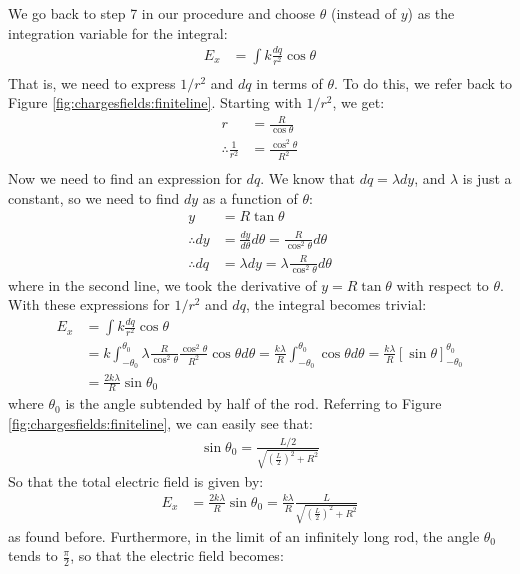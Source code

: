 \begin{example}
We go back to step 7 in our procedure and choose $\theta$ (instead of $y$) as the integration variable for the integral:
\begin{align*}
E_x &=\int k\frac{dq}{r^2}\cos\theta\\
\end{align*}
That is, we need to express $1/r^2$ and $dq$ in terms of $\theta$. To do this, we refer back to Figure \ref{fig:chargesfields:finiteline}. Starting with $1/r^2$, we get:
\begin{align*}
r &= \frac{R}{\cos\theta}\\
\therefore \frac{1}{r^2}&=\frac{\cos^2\theta}{R^2}\\
\end{align*}
Now we need to find an expression for $dq$. We know that $dq=\lambda dy$, and $\lambda$ is just a constant, so we need to find $dy$ as a function of $\theta$:
\begin{align*}
y &= R\tan\theta\\
\therefore dy &= \frac{dy}{d\theta}d\theta=\frac{R}{\cos^2\theta}d\theta\\
\therefore dq &= \lambda dy =\lambda\frac{R}{\cos^2\theta}d\theta
\end{align*}
where in the second line, we took the derivative of $y=R\tan\theta$ with respect to $\theta$. With these expressions for $1/r^2$ and $dq$, the integral becomes trivial:
\begin{align*}
E_x &=\int k\frac{dq}{r^2}\cos\theta\\
&=k\int_{-\theta_0}^{\theta_0} \lambda\frac{R}{\cos^2\theta} \frac{\cos^2\theta}{R^2} \cos\theta d\theta=\frac{k\lambda}{R}\int_{-\theta_0}^{\theta_0}\cos\theta d\theta=\frac{k\lambda}{R}\left[\sin\theta \right]_{-\theta_0}^{\theta_0}\\
&=\frac{2k\lambda}{R}\sin\theta_0
\end{align*}
where $\theta_0$ is the angle subtended by half of the rod. Referring to Figure \ref{fig:chargesfields:finiteline}, we can easily see that:
\begin{align*}
\sin\theta_0=\frac{L/2}{\sqrt{\left(\frac{L}{2}\right)^2+R^2}}
\end{align*}
So that the total electric field is given by:
\begin{align*}
E_x &=\frac{2k\lambda}{R}\sin\theta_0=\frac{k\lambda}{R}\frac{L}{\sqrt{\left(\frac{L}{2}\right)^2+R^2}}
\end{align*}
as found before. Furthermore, in the limit of an infinitely long rod, the angle $\theta_0$ tends to $\frac{\pi}{2}$, so that the electric field becomes:

\end{example}
